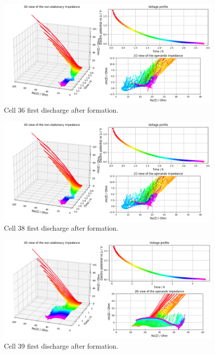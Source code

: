 \begin{figure}[h]
    \centering
    \includegraphics[width=\linewidth]{figures/application3/image8.png}
    \caption{Cell 36 first discharge after formation.}
    \label{fig:cell36_firs_cycle}
\end{figure}

\begin{figure}[h]
    \centering
    \includegraphics[width=\linewidth]{figures/application3/image8.png}
    \caption{Cell 38 first discharge after formation.}
    \label{fig:cell38_firs_cycle}
\end{figure}

\begin{figure}[h]
    \centering
    \includegraphics[width=\linewidth]{figures/application3/image9.png}
    \caption{Cell 39 first discharge after formation.}
    \label{fig:cell39_firs_cycle}
\end{figure}

